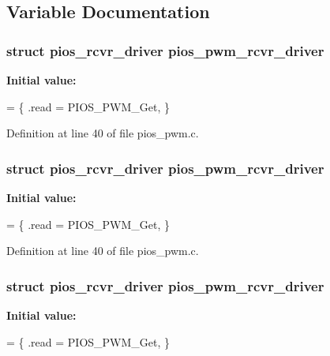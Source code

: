 \subsection{Variable Documentation}
\hypertarget{group___p_i_o_s___p_w_m_ga767a19a3a54afa71399b7467963690df}{
\subsubsection[{pios\-\_\-pwm\-\_\-rcvr\-\_\-driver}]{\setlength{\rightskip}{0pt plus 5cm}struct {\bf pios\-\_\-rcvr\-\_\-driver} pios\-\_\-pwm\-\_\-rcvr\-\_\-driver}}\label{group___p_i_o_s___p_w_m_ga767a19a3a54afa71399b7467963690df}
{\bfseries Initial value\-:}
\begin{DoxyCode}
= \{
        .read = PIOS\_PWM\_Get,
\}
\end{DoxyCode}


Definition at line 40 of file pios\-\_\-pwm.\-c.

\hypertarget{group___p_i_o_s___p_w_m_ga767a19a3a54afa71399b7467963690df}{
\subsubsection[{pios\-\_\-pwm\-\_\-rcvr\-\_\-driver}]{\setlength{\rightskip}{0pt plus 5cm}struct {\bf pios\-\_\-rcvr\-\_\-driver} pios\-\_\-pwm\-\_\-rcvr\-\_\-driver}}\label{group___p_i_o_s___p_w_m_ga767a19a3a54afa71399b7467963690df}
{\bfseries Initial value\-:}
\begin{DoxyCode}
= \{
        .read = PIOS\_PWM\_Get,
\}
\end{DoxyCode}


Definition at line 40 of file pios\-\_\-pwm.\-c.

\hypertarget{group___p_i_o_s___p_w_m_ga767a19a3a54afa71399b7467963690df}{
\subsubsection[{pios\-\_\-pwm\-\_\-rcvr\-\_\-driver}]{\setlength{\rightskip}{0pt plus 5cm}struct {\bf pios\-\_\-rcvr\-\_\-driver} pios\-\_\-pwm\-\_\-rcvr\-\_\-driver}}\label{group___p_i_o_s___p_w_m_ga767a19a3a54afa71399b7467963690df}
{\bfseries Initial value\-:}
\begin{DoxyCode}
= \{
        .read = PIOS\_PWM\_Get,
\}
\end{DoxyCode}


